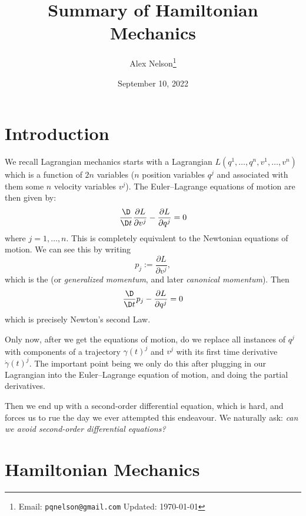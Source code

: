 \title{Summary of Hamiltonian Mechanics}
\author{Alex Nelson\footnote{Email: \texttt{pqnelson@gmail.com}\qquad
  Updated: \today}}
\date{September 10, 2022}
\maketitle

\section{Introduction}

We recall Lagrangian mechanics starts with a Lagrangian
$L(q^{1},\dots,q^{n},v^{1},\dots,v^{n})$ which is a function of $2n$
variables ($n$ position variables $q^{j}$ and associated with them some
$n$ velocity variables $v^{j}$). The Euler--Lagrange equations of motion
are then given by:
\begin{equation}
\frac{\D}{\D t}\frac{\partial L}{\partial v^{j}} - \frac{\partial L}{\partial q^{j}} = 0
\end{equation}
where $j=1,\dots,n$. This is completely equivalent to the Newtonian
equations of motion. We can see this by writing
\begin{equation}
p_{j} := \frac{\partial L}{\partial v^{j}},
\end{equation}
which is the  (or \emph{generalized momentum},
and later \emph{canonical momentum}). Then
\begin{equation}
\frac{\D}{\D t}p_{j} - \frac{\partial L}{\partial q^{j}} = 0
\end{equation}
which is precisely Newton's second Law.

\M
Only now, after we get the equations of motion, do we replace all
instances of $q^{j}$ with components of a trajectory $\gamma(t)^{j}$ and
$v^{j}$ with its first time derivative $\dot\gamma(t)^{j}$. The
important point being we only do this after plugging in our Lagrangian
into the Euler--Lagrange equation of motion, and doing the partial
derivatives.

Then we end up with a second-order differential equation, which is hard,
and forces us to rue the day we ever attempted this endeavour. We
naturally ask: \emph{can we avoid second-order differential equations?}

\section{Hamiltonian Mechanics}

